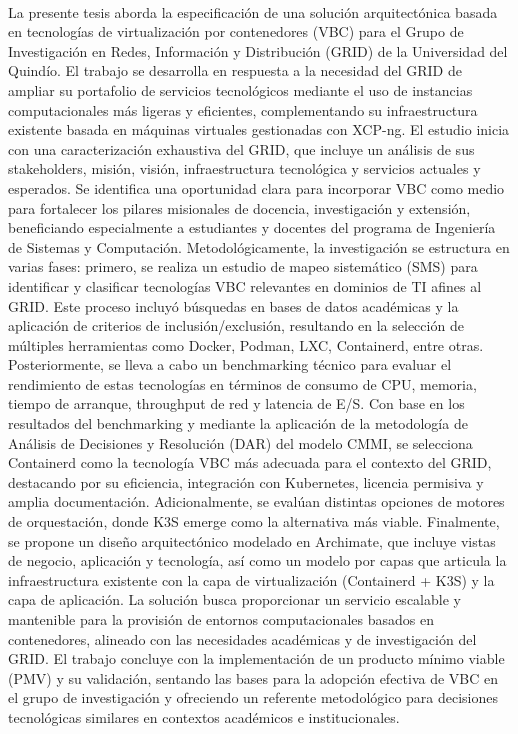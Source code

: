 \label{cap:resumen}
\mbox{}\\
La presente tesis aborda la especificación de una solución arquitectónica basada en tecnologías de virtualización por contenedores (VBC) para el Grupo de Investigación en Redes, Información y Distribución (GRID) de la Universidad del Quindío. El trabajo se desarrolla en respuesta a la necesidad del GRID de ampliar su portafolio de servicios tecnológicos mediante el uso de instancias computacionales más ligeras y eficientes, complementando su infraestructura existente basada en máquinas virtuales gestionadas con XCP-ng. El estudio inicia con una caracterización exhaustiva del GRID, que incluye un análisis de sus stakeholders, misión, visión, infraestructura tecnológica y servicios actuales y esperados. Se identifica una oportunidad clara para incorporar VBC como medio para fortalecer los pilares misionales de docencia, investigación y extensión, beneficiando especialmente a estudiantes y docentes del programa de Ingeniería de Sistemas y Computación. Metodológicamente, la investigación se estructura en varias fases: primero, se realiza un estudio de mapeo sistemático (SMS) para identificar y clasificar tecnologías VBC relevantes en dominios de TI afines al GRID. Este proceso incluyó búsquedas en bases de datos académicas y la aplicación de criterios de inclusión/exclusión, resultando en la selección de múltiples herramientas como Docker, Podman, LXC, Containerd, entre otras. Posteriormente, se lleva a cabo un benchmarking técnico para evaluar el rendimiento de estas tecnologías en términos de consumo de CPU, memoria, tiempo de arranque, throughput de red y latencia de E/S. Con base en los resultados del benchmarking y mediante la aplicación de la metodología de Análisis de Decisiones y Resolución (DAR) del modelo CMMI, se selecciona Containerd como la tecnología VBC más adecuada para el contexto del GRID, destacando por su eficiencia, integración con Kubernetes, licencia permisiva y amplia documentación. Adicionalmente, se evalúan distintas opciones de motores de orquestación, donde K3S emerge como la alternativa más viable. Finalmente, se propone un diseño arquitectónico modelado en Archimate, que incluye vistas de negocio, aplicación y tecnología, así como un modelo por capas que articula la infraestructura existente con la capa de virtualización (Containerd + K3S) y la capa de aplicación. La solución busca proporcionar un servicio escalable y mantenible para la provisión de entornos computacionales basados en contenedores, alineado con las necesidades académicas y de investigación del GRID. El trabajo concluye con la implementación de un producto mínimo viable (PMV) y su validación, sentando las bases para la adopción efectiva de VBC en el grupo de investigación y ofreciendo un referente metodológico para decisiones tecnológicas similares en contextos académicos e institucionales.

